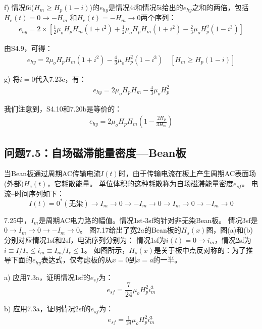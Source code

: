 f) 情况6i($H_m\ge H_p(1-i)$)的$e_{hy}$是情况4i和情况5i给出的$e_{hy}$之和的两倍，包括$H_e(t)=0\rightarrow-H_m$
和$H_e(t)=-H_m\rightarrow 0$两个序列：
\begin{align*}%
e_{hy}=2\times\left[\frac{1}{2}\mu_oH_pH_m(1+i^2)+\frac{1}{2}\mu_oH_pH_m(1+i^2)-\frac{2}{3}\mu_oH_{p}^{2}(1-i^3)\right] \tag{S4.9}
\end{align*}

由S4.9，可得：
\begin{align*}%
e_{hy}=2\mu_oH_pH_m(1+i^2)-\frac{4}{3}\mu_oH_{p}^{2}(1-i^3) \quad [H_m\geq H_p(1-i)] \tag{7.23c}
\end{align*}

g) 将$i=0$代入7.23c，有：
\begin{align*}%
e_{hy}=2\mu_oH_pH_m-\frac{4}{3}\mu_oH_{p}^{2} \tag{S4.10}
\end{align*}

我们注意到，S4.10和7.20b是等价的：
\begin{align*}%
e_{hy}=2\mu_oH_pH_m\left(1-\frac{2H_p}{3H_m}\right) \tag{7.20b}
\end{align*}


\subsection{问题7.5：自场磁滞能量密度---Bean板}
当Bean板通过周期AC传输电流$I(t)$时，由于传输电流在板上产生周期AC表面场(外部)$H_e(t)$，它耗散能量。
单位体积的这种耗散称为自场磁滞能量密度$e_{sf}$。 电流--时间序列如下：
\begin{equation}%
I(t)=0^*(\mbox{无染})\rightarrow I_m\rightarrow 0\rightarrow -I_m\rightarrow 0\rightarrow I_m\rightarrow 0\rightarrow -I_m\rightarrow 0
\end{equation}

7.25中，$I_m$是周期AC电力路的幅值。情况1st-3sf均针对非$无染$Bean板。
情况3sf是$0\rightarrow I_m\rightarrow 0\rightarrow -I_m\rightarrow 0$。
图7.17给出了宽$2a$的Bean板的$H_s(x)$图，图(a)和(b)分别对应情况1sf和2sf，电流序列分别为：
情况1sf为$i(t)=0\rightarrow i_m$，情况2sf为$i\equiv I/I_c\le i_m\equiv I_m/I_c\le 1$。
如图所示，$H_s(x)$是关于板中点反对称的：为了推导下面的$e_{hy}$表达式，仅考虑板的从$x=0$到$x=a$的一半。

a) 应用7.3a，证明情况1sf的$e_{sf}$为：
\begin{equation}%
e_{sf}=\frac{7}{24}\mu_oH_{p}^{2}i_{m}^{3}
\end{equation}

b) 应用7.3a，证明情况2sf的$e_{sf}$为：
\begin{align*}%
e_{sf}=\frac{1}{24}\mu_oH_{p}^{2}i_{m}^{3} \tag{7.26b}
\end{align*}

